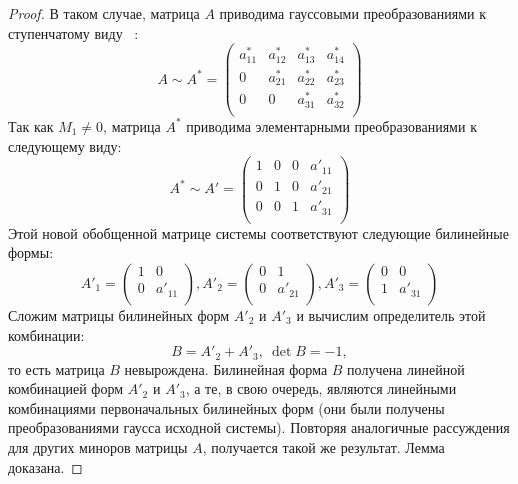 \begin{proof}
	В таком случае, матрица $A$ приводима гауссовыми преобразованиями к ступенчатому виду~
	\cite{costrikin_va1}:
	$$
		A \sim A^* = 
		\begin{pmatrix}
			a^*_{11} & a^*_{12} & a^*_{13} & a^*_{14} \\
		 	     0   & a^*_{21} & a^*_{22} & a^*_{23} \\
			     0   &   0      & a^*_{31} & a^*_{32} \\
		\end{pmatrix}
	$$
	Так как $M_1\ne 0$, матрица $A^*$ приводима элементарными преобразованиями к следующему 
	виду: 
	$$
		A^* \sim A' =
		\begin{pmatrix}
			     1 & 0 & 0 & a'_{11} \\
		 	     0 & 1 & 0 & a'_{21} \\
			     0 & 0 & 1 & a'_{31} \\
		\end{pmatrix} 
	$$ 
	Этой новой обобщенной матрице системы соответствуют следующие билинейные формы: 
	$$
		A'_1 = 
		\begin{pmatrix}
			1 & 0 \\
			0 & a'_{11}\\
		\end{pmatrix},
		A'_2 = 
		\begin{pmatrix}
			0 & 1 \\
			0 & a'_{21}\\
		\end{pmatrix},
		A'_3 = 
		\begin{pmatrix}
			0 & 0 \\
			1 & a'_{31}\\
		\end{pmatrix}
	$$
	Сложим матрицы билинейных форм $A'_2$ и $A'_3$ и вычислим определитель этой комбинации: 
	$$
		B = A'_2 + A'_3,~\det B = -1,
	$$
	то есть матрица $B$ невырождена.
	Билинейная форма $B$ получена линейной комбинацией форм $A'_2$ и $A'_3$, а те, в свою 
	очередь, являются линейными комбинациями первоначальных билинейных форм (они были 
	получены преобразованиями гаусса исходной системы). Повторяя аналогичные рассуждения для 
	других миноров матрицы $A$, получается такой же результат. Лемма доказана.
\end{proof}

